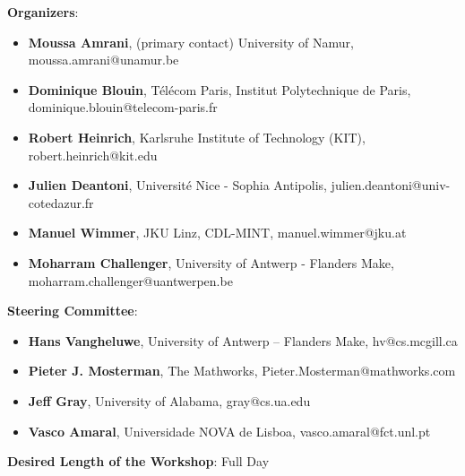 \noindent
\textbf{Organizers}:
\begin{itemize}
    \item \textbf{Moussa Amrani}, (primary contact) University of Namur, moussa.amrani@unamur.be
    
    \item \textbf{Dominique Blouin}, T\'el\'ecom Paris, Institut Polytechnique de Paris, dominique.blouin@telecom-paris.fr
    
    \item \textbf{Robert Heinrich}, Karlsruhe Institute of Technology (KIT), robert.heinrich@kit.edu
    
    \item \textbf{Julien Deantoni}, Universit\'e Nice - Sophia Antipolis, julien.deantoni@univ-cotedazur.fr
    
    \item \textbf{Manuel Wimmer}, JKU Linz, CDL-MINT, manuel.wimmer@jku.at
    
    \item \textbf{Moharram Challenger}, University of Antwerp - Flanders Make, moharram.challenger@uantwerpen.be
\end{itemize}

\noindent
\textbf{Steering Committee}:
\begin{itemize}
    \item \textbf{Hans Vangheluwe}, University of Antwerp – Flanders Make, hv@cs.mcgill.ca
    \item \textbf{Pieter J. Mosterman}, The Mathworks, Pieter.Mosterman@mathworks.com
    \item \textbf{Jeff Gray}, University of Alabama, gray@cs.ua.edu
    \item \textbf{Vasco Amaral}, Universidade NOVA de Lisboa, vasco.amaral@fct.unl.pt
\end{itemize}

\noindent
\textbf{Desired Length of the Workshop}: Full Day \\

